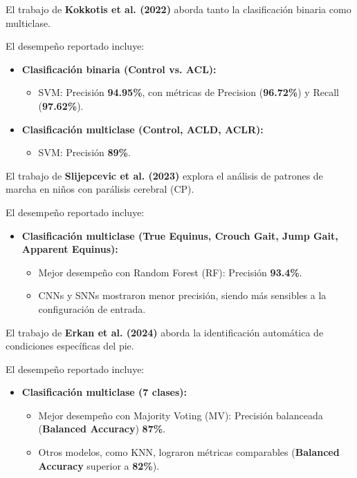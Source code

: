 \documentclass{report}
\begin{document}
    El trabajo de \textbf{Kokkotis et al. (2022)} aborda tanto la clasificación binaria como multiclase.
    
    El desempeño reportado incluye:
    
    \begin{itemize}
        \item \textbf{Clasificación binaria (Control vs. ACL):}
        \begin{itemize}
            \item SVM: Precisión \textbf{94.95\%}, con métricas de Precision (\textbf{96.72\%}) y Recall (\textbf{97.62\%}).
        \end{itemize}
        \item \textbf{Clasificación multiclase (Control, ACLD, ACLR):}
        \begin{itemize}
            \item SVM: Precisión \textbf{89\%}.
        \end{itemize}
    \end{itemize}
    
    
    El trabajo de \textbf{Slijepcevic et al. (2023)} explora el análisis de patrones de marcha en niños con parálisis cerebral (CP).
    
    El desempeño reportado incluye:
    
    \begin{itemize}
        \item \textbf{Clasificación multiclase (True Equinus, Crouch Gait, Jump Gait, Apparent Equinus):}
        \begin{itemize}
            \item Mejor desempeño con Random Forest (RF): Precisión \textbf{93.4\%}.
            \item CNNs y SNNs mostraron menor precisión, siendo más sensibles a la configuración de entrada.
        \end{itemize}
    \end{itemize}
    
    El trabajo de \textbf{Erkan et al. (2024)} aborda la identificación automática de condiciones específicas del pie.
    
    El desempeño reportado incluye:
    \begin{itemize}
        \item \textbf{Clasificación multiclase (7 clases):} 
        \begin{itemize}
            \item Mejor desempeño con Majority Voting (MV): Precisión balanceada (\textbf{Balanced Accuracy}) \textbf{87\%}.
            \item Otros modelos, como KNN, lograron métricas comparables (\textbf{Balanced Accuracy} superior a \textbf{82\%}).
        \end{itemize}
    \end{itemize}
    
\end{document}
